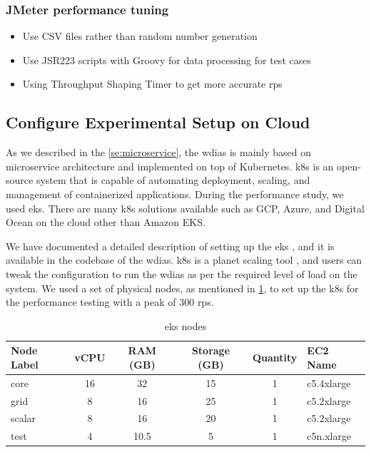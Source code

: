 \subsubsection{JMeter performance tuning}
\begin{itemize}
    \item Use CSV files rather than random number generation
    \item Use JSR223 scripts with Groovy for data processing for test cases
    \item Using Throughput Shaping Timer to get more accurate \acrshort{rps}
\end{itemize}


\subsection{Configure Experimental Setup on Cloud}
\label{subse:test_sys_config}
As we described in the \cref{se:microservice}, the \acrshort{wdias} is mainly based on microservice architecture and implemented on top of Kubernetes. \acrfull{k8s} is an open-source system that is capable of automating deployment, scaling, and management of containerized applications. During the performance study, we used \acrfull{eks}. There are many \acrshort{k8s} solutions available such as GCP, Azure, and Digital Ocean on the cloud other than Amazon EKS.

We have documented a detailed description of setting up the \acrshort{eks} \cite{KarunarathneWdias/Amazon_EKS.md:EKS}, and it is available in the codebase of the \acrshort{wdias}. \acrshort{k8s} is a planet scaling tool \cite{LinuxFoundationProduction-GradeKubernetes}, and users can tweak the configuration to run the \acrshort{wdias} as per the required level of load on the system. We used a set of physical nodes, as mentioned in \cref{tab:aws_eks_nodes}, to set up the \acrshort{k8s} for the performance testing with a peak of 300 \acrshort{rps}.

\begin{table}[ht]
\centering
\caption{\acrshort{eks} nodes}
\footnotesize
\begin{tabular}{|l|c|c|c|c|l|}
\hline
\textbf{Node Label} & \textbf{vCPU} & \textbf{RAM (GB)} & \textbf{Storage (GB)} & \textbf{Quantity} & \textbf{EC2 Name} \\ \hline
core & 16 & 32 & 15 & 1 & c5.4xlarge \\ \hline
grid & 8 & 16 & 25 & 1 & c5.2xlarge \\ \hline
scalar & 8 & 16 & 20 & 1 & c5.2xlarge \\ \hline
test & 4 & 10.5 & 5 & 1 & c5n.xlarge \\ \hline
\end{tabular}
\label{tab:aws_eks_nodes}
\end{table}

